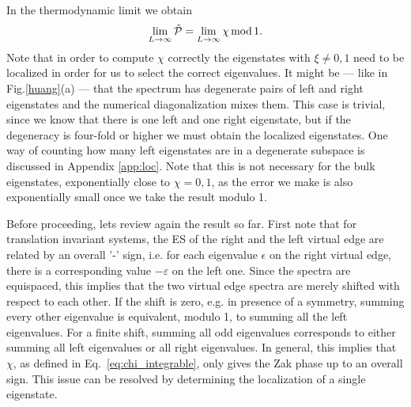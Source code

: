\documentclass[twocolumn,amsmath,longbibliography,amssymb,superscriptaddress]{revtex4-1}
\begin{document}
In the thermodynamic limit we obtain
\begin{equation}
\lim_{L \rightarrow \infty} \tilde{\mathcal{P}} = \lim_{L \rightarrow \infty} \chi \, {\rm mod } \, 1.
\label{eq:ptilde_eq_chi}
\end{equation}
Note that in order to compute $\chi$ correctly the eigenstates with $\xi \neq 0,1$ need to be localized in order for us to select the correct eigenvalues. It might be --- like in Fig.\ref{huang}(a) --- that the spectrum has degenerate pairs of left and right eigenstates and the numerical diagonalization mixes them. This case is trivial, since we know that there is one left and one right eigenstate, but if the degeneracy is four-fold or higher we must obtain the localized eigenstates. One way of counting how many left eigenstates are in a degenerate subspace is discussed in Appendix \ref{app:loc}. Note that this is not necessary for the bulk eigenstates, exponentially close to $\chi=0,1$, as the error we make is also exponentially small once we take the result modulo 1.  

Before proceeding, lets review again the result so far. First note that for translation invariant systems, the ES of the right and the left virtual edge are related by an overall '-' sign, i.e. for each eigenvalue $\epsilon$ on the right virtual edge, there is a corresponding value $-\varepsilon$ on the left one. 
Since the spectra are equispaced, this implies that the two virtual edge spectra are merely shifted with respect to each other.
If the shift is zero, e.g.  in presence of a symmetry, summing every other eigenvalue is equivalent, modulo 1, to summing all the left eigenvalues. For a finite shift, summing all odd eigenvalues corresponds to either summing all left eigenvalues or all right eigenvalues. In general, this implies that $\chi$, as defined in Eq.~\eqref{eq:chi_integrable}, only gives the Zak phase up to an overall sign. This issue can be resolved by determining the localization of a single eigenstate. 
\end{document}
